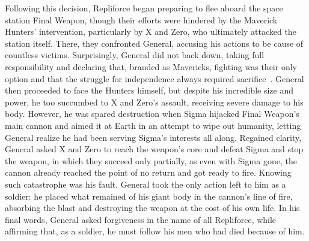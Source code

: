 Following this decision, Repliforce began preparing to flee aboard the space station Final Weapon, though their efforts were hindered by the Maverick Hunters’ intervention, particularly by X and Zero, who ultimately attacked the station itself. There, they confronted General, accusing his actions to be cause of countless victims. Surprisingly, General did not back down, taking full responsibility and declaring that, branded as Mavericks, fighting was their only option and that the struggle for independence always required sacrifice~\cite{wordpress:X4_japanese_script_X,wordpress:X4_japanese_script_Z}. General then proceeded to face the Hunters himself, but despite his incredible size and power, he too succumbed to X and Zero’s assault, receiving severe damage to his body. However, he was spared destruction when Sigma hijacked Final Weapon’s main cannon and aimed it at Earth in an attempt to wipe out humanity, letting General realize he had been serving Sigma’s interests all along. Regained clarity, General asked X and Zero to reach the weapon’s core and defeat Sigma and stop the weapon, in which they succeed only partially, as even with Sigma gone, the cannon already reached the point of no return and got ready to fire. Knowing such catastrophe was his fault, General took the only action left to him as a soldier: he placed what remained of his giant body in the cannon’s line of fire, absorbing the blast and destroying the weapon at the cost of his own life. In his final words, General asked forgiveness in the name of all Repliforce, while affirming that, as a soldier, he must follow his men who had died because of him.

